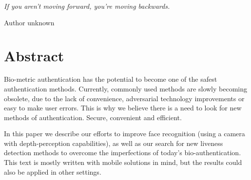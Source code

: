 \begin{flushright}
    \textit{If you aren't moving forward, you're moving backwards.}

    Author unknown %
\end{flushright}


\section*{Abstract}
Bio-metric authentication has the potential to become
one of the safest authentication methods.
Currently, commonly used methods are slowly becoming obsolete,
due to the lack of convenience, adversarial technology
improvements or easy to make user errors.
This is why we believe there is a need to look for
new methods of authentication. Secure, convenient and efficient.\par
\bigskip


In this paper we describe our efforts to improve face recognition
(using a camera with depth-perception capabilities), as well as
our search for new liveness detection methods to overcome
the imperfections of today's bio-authentication.\\
This text is mostly written with mobile solutions in mind,
but the results could also be applied in other settings.
